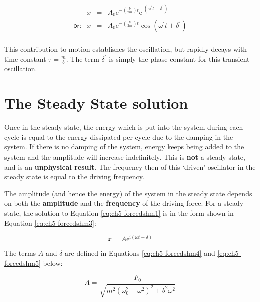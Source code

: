 \documentclass[
]{book}
\begin{document}
\begin{equation}
\begin{array}{lrcl}
 & x &=& A_0 \mathrm{e}^{- \left(\frac{b}{2m}\right)t} \mathrm{e}^{\mathrm{i} \left( \omega^\prime t + \delta^\prime \right)} \\
\textsf{or:} & x &=& A_0 \mathrm{e}^{- \left(\frac{b}{2m}\right)t} \cos \left( \omega^\prime t + \delta^\prime \right) \\
\end{array}
\label{eq:ch5-forcedshm2}
\end{equation}

This contribution to motion establishes the oscillation, but rapidly decays with time constant \(\tau = \frac{m}{b}\). The term \(\delta^\prime\) is simply the phase constant for this transient oscillation.

\hypertarget{sec-ch5-steadystatesolution}{%
\section{The Steady State solution}\label{sec-ch5-steadystatesolution}}

Once in the steady state, the energy which is put into the system during each cycle is equal to the energy dissipated per cycle due to the damping in the system. If there is no damping of the system, energy keeps being added to the system and the amplitude will increase indefinitely. This is \textbf{not} a steady state, and is an \textbf{unphysical result}. The frequency then of this `driven' oscillator in the steady state is equal to the driving frequency.

The amplitude (and hence the energy) of the system in the steady state depends on both the \textbf{amplitude} and the \textbf{frequency} of the driving force. For a steady state, the solution to Equation \eqref{eq:ch5-forcedshm1} is in the form shown in Equation \eqref{eq:ch5-forcedshm3}:

\begin{equation}
x = A \mathrm{e}^{\mathrm{i}\left(\omega t - \delta \right)}
\label{eq:ch5-forcedshm3}
\end{equation}

The terms \(A\) and \(\delta\) are defined in Equations \eqref{eq:ch5-forcedshm4} and \eqref{eq:ch5-forcedshm5} below:

\begin{equation}
A = \frac{F_0}{\sqrt{m^2 \left(\omega_0^2 - \omega^2 \right)^2 + b^2 \omega^2}}
\label{eq:ch5-forcedshm4}
\end{equation}
\end{document}
